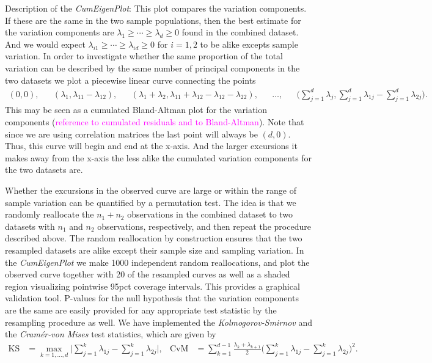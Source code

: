 \documentclass[titlepage,11pt,twoside]{article}
\newcommand{\hl}[1]{\textcolor{magenta}{#1}}
\begin{document}
Description of the \emph{CumEigenPlot}: This plot compares the variation components. If these are the same in the two sample populations, then the best estimate for the variation components are $\lambda_1 \ge \dotsm \ge \lambda_d \ge 0$ found in the combined dataset. And we would expect $\lambda_{i1} \ge \dotsm \ge \lambda_{id} \ge 0$ for $i=1,2$ to be alike excepts sample variation. In order to investigate whether the same proportion of the total variation can be described by the same number of principal components in the two datasets we plot a piecewise linear curve connecting the points
\begin{align*}
(0,0), &&
(\lambda_1,\lambda_{11}-\lambda_{12}), &&
(\lambda_1 + \lambda_2,\lambda_{11}+\lambda_{12}-\lambda_{12}-\lambda_{22}), &&
\ldots, &&
\bigg( \sum_{j=1}^d \lambda_j, \sum_{j=1}^d \lambda_{1j} - \sum_{j=1}^d \lambda_{2j} \bigg).
\end{align*}
This may be seen as a cumulated Bland-Altman plot for the variation components (\hl{reference to cumulated residuals and to Bland-Altman}). Note that since we are using correlation matrices the last point will always be $(d,0)$. Thus, this curve will begin and end at the x-axis. And the larger excursions it makes away from the x-axis the less alike the cumulated variation components for the two datasets are.

Whether the excursions in the observed curve are large or within the range of sample variation can be quantified by a permutation test. The idea is that we randomly reallocate the $n_1+n_2$ observations in the combined dataset to two datasets with $n_1$ and $n_2$ observations, respectively, and then repeat the procedure described above. The random reallocation by construction ensures that the two resampled datasets are alike except their sample size and sampling variation. In the \emph{CumEigenPlot} we make 1000 independent random reallocations, and plot the observed curve together with 20 of the resampled curves as well as a shaded region visualizing pointwise 95pct coverage intervals. This provides a graphical validation tool. P-values for the null hypothesis that the variation components are the same are easily provided for any appropriate test statistic by the resampling procedure as well. We have implemented the \emph{Kolmogorov-Smirnov} and the \emph{Cram\'er-von Mises} test statistics, which are given by
\begin{align*}
\text{KS} &= \max_{k=1,\dotsc,d} \bigg\lvert \sum_{j=1}^k \lambda_{1j} - \sum_{j=1}^k \lambda_{2j} \bigg\rvert, &
\text{CvM} &= \sum_{k=1}^{d-1} \frac{\lambda_k + \lambda_{k+1}}{2} \bigg( \sum_{j=1}^k \lambda_{1j} - \sum_{j=1}^k \lambda_{2j} \bigg)^2.
\end{align*}
\end{document}
